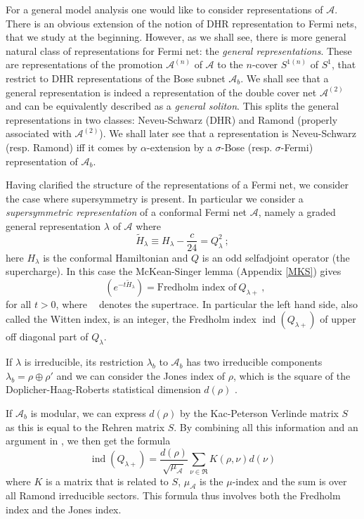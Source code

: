 \documentclass[11pt]{article}
\DeclareMathOperator{\Str}{Tr_{s}}
\DeclareMathOperator{\ind}{ind}
\def\a{\alpha}
\def\l{\lambda}
\def\r{\rho}
\def\A{{\cal A}}
\def\s{{\sigma}}
\def\A{{\mathcal A}}
\begin{document}
For a general model analysis one would like to consider representations of $\A$. There is an obvious extension of the notion of DHR representation to Fermi nets, that we study at the beginning. However, as we shall see, there is more general natural class of representations for Fermi net: the \emph{general representations}. These are representations of the promotion $\A^{(n)}$ of $\A$ to the $n$-cover $S^{1(n)}$ of $S^1$, that restrict to DHR representations of the Bose subnet $\A_b$. We shall see that a general representation is indeed  a representation of the double cover net $\A^{(2)}$ and can be equivalently described as a \emph{general soliton}. This splits the general representations in two classes: Neveu-Schwarz (DHR) and Ramond (properly associated with $\A^{(2)}$). We shall later see that a representation is Neveu-Schwarz (resp. Ramond) iff it comes by $\a$-extension by a $\s$-Bose (resp. $\s$-Fermi) representation of $\A_b$.

Having clarified the structure of the representations of a Fermi net, we consider the case where supersymmetry is present. In particular we consider a \emph{supersymmetric representation} of a conformal Fermi net $\A$, namely a graded general representation $\l$ of $\A$ where 
\[
\tilde H_\l \equiv H_\l - \frac{c}{24} = Q_\l^2 \ ;
\]
here $H_\l$ is the conformal Hamiltonian and $Q$ is an odd selfadjoint operator (the supercharge). In this case the McKean-Singer lemma (Appendix \ref{MKS}) gives
\[
\Str(e^{-t\tilde H_\l}) = \text{Fredholm index of}\ Q_{\l +}\ , 
\]
for all $t>0$, where $\Str$ denotes the supertrace. In particular the left hand side, also called the Witten index, is an integer, the Fredholm index $\ind(Q_{\l +})$ of upper off diagonal part of $Q_\l$.

If $\l$ is irreducible, its restriction $\l_b$ to $\A_b$ has two irreducible components $\l_b = \r\oplus\r'$ and we can consider the Jones index of $\r$, which is the square of the Doplicher-Haag-Roberts statistical dimension $d(\r)$ \cite{L5}.

If $\A_b$ is modular, we can express $d(\r)$ by the Kac-Peterson Verlinde matrix $S$ as this is equal to the Rehren matrix $S$. By combining all this information and an argument in \cite{KL05}, we then get the formula
\[
\ind(Q_{\l +}) = 
\frac{d(\r)}{\sqrt{\mu_\A}}\sum_{\nu\in\mathfrak R}
K(\r,\nu)d(\nu) 
\]
where $K$ is a matrix that is related to $S$, $\mu_\A$ is the $\mu$-index \cite{KLM} and the sum is over all Ramond irreducible sectors. This formula thus involves both the Fredholm index and the Jones index.
\end{document}
